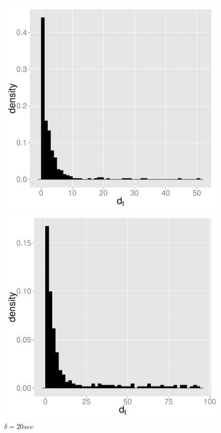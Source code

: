 \documentclass{wscpaperproc}
\theoremstyle{wsc}
\begin{document}
\begin{figure}[h]
\begin{minipage}[c]{.3\textwidth}
    \includegraphics[scale=0.25]{10sec.pdf}
    \caption*{$\delta=10 sec$}

\end{minipage}
\hspace*{\fill} %
\begin{minipage}[c]{.3\textwidth}
\centering
    \includegraphics[scale=0.25]{20sec.pdf}
    \caption*{$\delta=20 sec$}


\end{minipage}
\end{figure}
\end{document}
